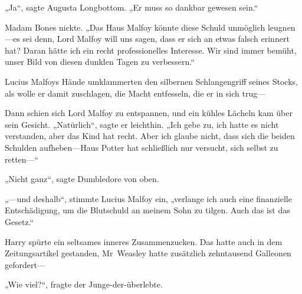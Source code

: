 „Ja“, sagte Augusta Longbottom.
„Er muss so dankbar gewesen sein.“

Madam Bones nickte.
„Das Haus Malfoy könnte diese Schuld unmöglich leugnen—es sei denn, Lord Malfoy will uns sagen, dass er sich an etwas falsch erinnert hat? Daran hätte ich ein recht professionelles Interesse. Wir sind immer bemüht, unser Bild von diesen dunklen Tagen zu verbessern.“

Lucius Malfoys Hände umklammerten den silbernen Schlangengriff seines Stocks, als wolle er damit zuschlagen, die Macht entfesseln, die er in sich trug—

Dann schien sich Lord Malfoy zu entspannen, und ein kühles Lächeln kam über sein Gesicht.
„Natürlich“, sagte er leichthin.
„Ich gebe zu, ich hatte es nicht verstanden, aber das Kind hat recht. Aber ich glaube nicht, dass sich die beiden Schulden aufheben—Haus Potter hat schließlich nur versucht, sich selbst zu retten—“

„Nicht ganz“, sagte Dumbledore von oben.

„—und deshalb“, stimmte Lucius Malfoy ein, „verlange ich auch eine finanzielle Entschädigung, um die Blutschuld an meinem Sohn zu tilgen. Auch das ist das Gesetz.“

Harry spürte ein seltsames inneres Zusammenzucken. Das hatte auch in dem Zeitungsartikel gestanden, Mr~Weasley hatte zusätzlich zehntausend Galleonen gefordert—

„Wie viel?“, fragte der Junge-der-überlebte.

